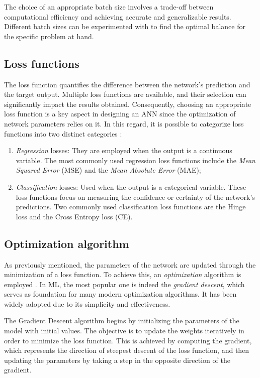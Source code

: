 The choice of an appropriate batch size involves a trade-off between computational efficiency and achieving accurate and generalizable results. Different batch sizes can be experimented with to find the optimal balance for the specific problem at hand.

\subsection{Loss functions}

The loss function quantifies the difference between the network's prediction and the target output. Multiple loss functions are available, and their selection can significantly impact the results obtained. Consequently, choosing an appropriate loss function is a key aspect in designing an ANN since the optimization of network parameters relies on it. In this regard, it is possible to categorize loss functions into two distinct categories \cite{CLFML}:
\begin{enumerate}
	\item \textit{Regression} losses: They are employed when the output is a continuous variable. The most commonly used regression loss functions include the \textit{Mean Squared Error} (MSE) and the \textit{Mean Absolute Error} (MAE);
	\item \textit{Classification} losses: Used when the output is a categorical variable. These loss functions focus on measuring the confidence or certainty of the network's predictions. Two commonly used classification loss functions are the Hinge loss and the Cross Entropy loss (CE).
\end{enumerate}

\subsection{Optimization algorithm}

As previously mentioned, the parameters of the network are updated through the minimization of a loss function. To achieve this, an \textit{optimization} algorithm is employed \cite{Goodfellow-et-al-2016}. In ML, the most popular one is indeed the \textit{gradient descent}, which serves as foundation for many modern optimization algorithms. It has been widely adopted due to its simplicity and effectiveness.

The Gradient Descent algorithm begins by initializing the parameters of the model with initial values. The objective is to update the weights iteratively in order to minimize the loss function. This is achieved by computing the gradient, which represents the direction of steepest descent of the loss function, and then updating the parameters by taking a step in the opposite direction of the gradient.

